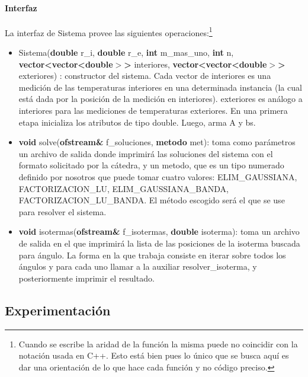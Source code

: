 \paragraph{Interfaz}
La interfaz de Sistema provee las siguientes operaciones:\footnote{Cuando se escribe la aridad de la función la misma puede no coincidir con la notación usada en C++. Esto está bien pues lo único que se busca aquí es dar una orientación de lo que hace cada función y no código preciso.}

\begin{itemize}
    \item Sistema(\textbf{double} r\_i,
                    \textbf{double} r\_e,
          \textbf{int} m\_mas\_uno,
          \textbf{int} n,
          \textbf{vector<vector<double$>$>} interiores,
          \textbf{vector<vector<double$>$>} exteriores) :
        constructor del sistema. Cada vector de interiores es una medición de las temperaturas interiores en una determinada instancia (la cual está dada por la posición de la medición en interiores). exteriores es análogo a interiores para las mediciones de temperaturas exteriores. En una primera etapa inicializa los atributos de tipo double. Luego, arma A y bs.
          
  \item \textbf{void} solve(\textbf{ofstream\&} f\_soluciones, \textbf{metodo} met):  toma como parámetros un archivo de salida donde imprimirá las soluciones del sistema con el formato solicitado por la cátedra, y un metodo, que es un tipo numerado definido por nosotros que puede tomar cuatro valores: ELIM\_GAUSSIANA, \mbox{FACTORIZACION\_LU,} ELIM\_GAUSSIANA\_BANDA, FACTORIZACION\_LU\_BANDA. El método escogido será el que se use para resolver el sistema.

  \item \textbf{void} isotermas(\textbf{ofstream\&} f\_isotermas, \textbf{double} isoterma): toma un archivo de salida en el que imprimirá la lista de las posiciones de la isoterma buscada para ángulo. La forma en la que trabaja consiste en iterar sobre todos los ángulos y para cada uno llamar a la auxiliar resolver\_isoterma, y posteriormente imprimir el resultado.   

\end{itemize}

\subsection{Experimentación}

